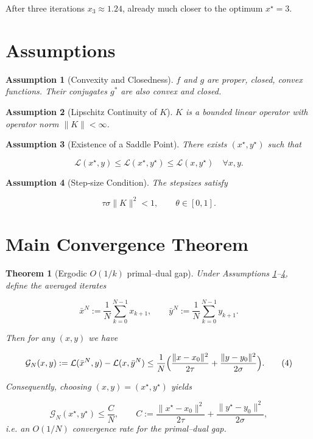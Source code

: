 \documentclass{article}
\newtheorem{theorem}{Theorem}
\newtheorem{assumption}{Assumption}
\begin{document}
After three iterations $x_{3}\approx1.24$, already much closer to the optimum $x^{\star}=3$.

\section*{Assumptions}
\begin{assumption}[Convexity and Closedness]\label{ass:conv}
$f$ and $g$ are proper, closed, convex functions. Their conjugates $g^{*}$ are also convex and closed.
\end{assumption}
\begin{assumption}[Lipschitz Continuity of $K$]\label{ass:K}
$K$ is a bounded linear operator with operator norm $\|K\|<\infty$.
\end{assumption}
\begin{assumption}[Existence of a Saddle Point]\label{ass:saddle}
There exists $(x^{\star},y^{\star})$ such that  

\[
\mathcal{L}(x^{\star},y)\le\mathcal{L}(x^{\star},y^{\star})\le\mathcal{L}(x,y^{\star})\quad\forall x,y.
\]
\end{assumption}
\begin{assumption}[Step‑size Condition]\label{ass:steps}
The stepsizes satisfy  

\[
\tau\sigma\|K\|^{2}<1,\qquad \theta\in[0,1].
\]
\end{assumption}

\section*{Main Convergence Theorem}
\begin{theorem}[Ergodic $O(1/k)$ primal–dual gap]\label{thm:main}
Under Assumptions \ref{ass:conv}–\ref{ass:steps}, define the averaged iterates  

\[
\bar{x}^{N}:=\frac{1}{N}\sum_{k=0}^{N-1}x_{k+1},\qquad
\bar{y}^{N}:=\frac{1}{N}\sum_{k=0}^{N-1}y_{k+1}.
\]

Then for any $(x,y)$ we have  

\[
\mathcal{G}_{N}(x,y):=
\mathcal{L}(\bar{x}^{N},y)-\mathcal{L}(x,\bar{y}^{N})
\le\frac{1}{N}\Bigl(
\frac{\|x-x_{0}\|^{2}}{2\tau}
+\frac{\|y-y_{0}\|^{2}}{2\sigma}
\Bigr).
\tag{4}
\]

Consequently, choosing $(x,y)=(x^{\star},y^{\star})$ yields  

\[
\mathcal{G}_{N}(x^{\star},y^{\star})\le
\frac{C}{N},\qquad C:=\frac{\|x^{\star}-x_{0}\|^{2}}{2\tau}
            +\frac{\|y^{\star}-y_{0}\|^{2}}{2\sigma},
\]
i.e. an $O(1/N)$ convergence rate for the primal–dual gap.
\end{theorem}
\end{document}

